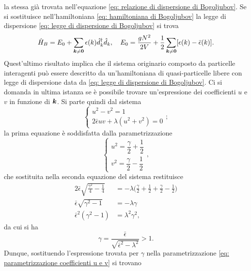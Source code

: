 la stessa già trovata nell'equazione \eqref{eq: relazione di dispersione di Bogoljubov}. Se si sostituisce nell'hamiltoniana \eqref{eq: hamiltoniana di Bogoljubov} la legge di dispersione \eqref{eq: legge di dispersione di Bogoljubov} si trova
\begin{equation}
    \hat{H}_B = E_0 + \sum_{\bm{k} \neq \bm{0}}\epsilon(k)\hat{d}^\dagger_k\hat{d}_k,\quad E_0 = \frac{gN^2}{2V} + \frac{1}{2}\sum_{\bm{k} \neq \bm{0}}[\epsilon(k) - \bar{\epsilon}(k)].
\end{equation}
Quest'ultimo risultato implica che il sistema originario composto da particelle interagenti può essere descritto da un'hamiltoniana di quasi-particelle libere con legge di dispersione data da \eqref{eq: legge di dispersione di Bogoljubov}. Ci si domanda in ultima istanza se è possibile trovare un'espressione dei coefficienti $u$ e $v$ in funzione di $\bm{k}$. Si parte quindi dal sistema 
\begin{equation}
    \begin{cases}
        u^2 - v^2 = 1 \\
        2\bar{\epsilon}uv + \lambda(u^2 + v^2) = 0
    \end{cases};
\end{equation}
la prima equazione è soddisfatta dalla parametrizzazione 
\begin{equation}
\label{eq: parametrizzazione coefficienti u e v}
    \begin{cases}
        u^2 = \dfrac{\gamma}{2} + \dfrac{1}{2} \\[2ex]
        v^2 = \dfrac{\gamma}{2} - \dfrac{1}{2}
    \end{cases},
\end{equation}
che sostituita nella seconda equazione del sistema restituisce
\begin{equation}
    \begin{split}
        2\bar{\epsilon}\sqrt{\frac{\gamma^2}{4} - \frac{1}{4}} &= -\lambda\bigg(\frac{\gamma}{2} + \frac{1}{2} + \frac{\gamma}{2} - \frac{1}{2}\bigg) \\
        \bar{\epsilon}\sqrt{\gamma^2 - 1} &= -\lambda\gamma \\
        \bar{\epsilon}^2(\gamma^2 - 1) &= \lambda^2\gamma^2,
    \end{split}
\end{equation}
da cui si ha 
\begin{equation}
    \gamma = \frac{\bar{\epsilon}}{\sqrt{\bar{\epsilon}^2 - \lambda^2}} > 1.
\end{equation}
Dunque, sostituendo l'espressione trovata per $\gamma$ nella parametrizzazione \eqref{eq: parametrizzazione coefficienti u e v} si trovano
